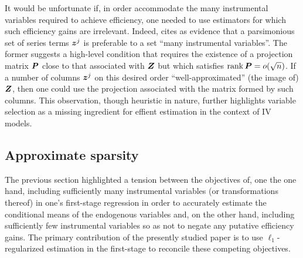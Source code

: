 \documentclass{uwstat572}
\theoremstyle{definition}
\theoremstyle{remark}
\newcommand{\rank}{\mathrm{rank} \,}
\numberwithin{equation}{section}
\begin{document}
It would be unfortunate if, in order accommodate the many instrumental variables required to achieve efficiency, one needed to use estimators for which such efficiency gains are irrelevant. Indeed, \cite{H02} cites \cite{N97} as evidence that a parsimonious set of series terms $\z^j$ is preferable to a set ``many instrumental variables''. The former suggests a high-level condition that requires the existence of a projection matrix $\P$ close to that associated with $\Z$ but which satisfies $\rank \P = o(\sqrt{n})$. If a number of columns $\z^j$ on this desired order ``well-approximated'' (the image of) $\Z$, then one could use the projection associated with the matrix formed by such columns. This observation, though heuristic in nature, further highlights variable selection as a missing ingredient for effient estimation in the context of IV models.


%
\subsection{Approximate sparsity}


The previous section highlighted a tension between the objectives of, one the one hand, including sufficiently many instrumental variables (or transformations thereof) in one's first-stage regression in order to accurately estimate the conditional means of the endogenous variables and, on the other hand, including sufficiently few instrumental variables so as not to negate any putative efficiency gains. The primary contribution of the presently studied paper is to use $\ell_1$-regularized estimation in the first-stage to reconcile these competing objectives. 
\end{document}
